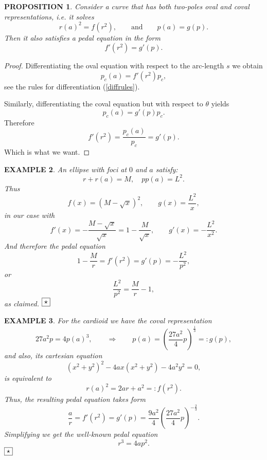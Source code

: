 \documentclass[10pt,a4paper,reqno]{amsart}
\newtheorem{defi}{\bf D\scriptsize EFINITION \normalsize}
\newtheorem{exa}[defi]{\bf E\scriptsize XAMPLE \normalsize}
\newtheorem{prop}[defi]{\bf P\scriptsize ROPOSITION \normalsize}
\def\kopr{\hfill\raisebox{3pt}{\framebox{$\star$}}}
\newenvironment{example}{\begin{exa}\rm}{$\kopr$\end{exa}}
\newenvironment{definition}{\begin{defi}\rm}{\end{defi}}
\newenvironment{proposition}{\begin{prop}\it}{\end{prop}}
\newcommand{\zav}[1]{\left( #1 \right)}
\begin{document}
\begin{proposition}
Consider a curve that has both two-poles oval and coval representations, i.e. it solves
$$
r(a)^2=f(r^2),\qquad \text{and} \qquad p(a)=g(p).
$$ 
Then it also satisfies a pedal equation in the form
$$
f'(r^2)=g'(p).
$$
\end{proposition}
\begin{proof}
Differentiating the oval equation with respect to the arc-length $s$ we obtain
$$
p_c(a)=f'(r^2)p_c,
$$
see the rules for differentiation (\ref{diffrules}).

Similarly, differentiating the coval equation but with respect to $\theta$ yields
$$
p_c(a)=g'(p)p_c.
$$ 
Therefore
$$
f'(r^2)=\frac{p_c(a)}{p_c}=g'(p).
$$
Which is what we want.
\end{proof}
\begin{example}
An ellipse with foci at $0$ and $a$ satisfy:
$$
r+r(a)=M,\quad pp(a)=L^2. 
$$
Thus
$$
f(x)=(M-\sqrt{x})^2,\qquad g(x)=\frac{L^2}{x},
$$
in our case with
$$
f'(x)=-\frac{M-\sqrt{x}}{\sqrt{x}}=1-\frac{M}{\sqrt{x}},\qquad g'(x)=-\frac{L^2}{x^2}.
$$
And therefore the pedal equation
$$
1-\frac{M}{r}=f'(r^2)=g'(p)=-\frac{L^2}{p^2},
$$
or
$$
\frac{L^2}{p^2}=\frac{M}{r}-1,
$$
as claimed.
\end{example}
\begin{example}
For the cardioid we have the coval representation
$$
27a^2p=4p(a)^3,\qquad \Longrightarrow \qquad p(a)=\zav{\frac{27 a^2}{4}p}^{\frac13}=:g(p),
$$
and also, its cartesian equation
$$
(x^2+y^2)^2-4ax(x^2+y^2)-4a^2y^2=0,
$$
is equivalent to 
$$
r(a)^2=2a r+a^2=:f(r^2).
$$
Thus, the resulting pedal equation takes form
$$
\frac{a}{r}=f'(r^2)=g'(p)=\frac{9a^2}{4} \zav{\frac{27 a^2}{4}p}^{-\frac23}.
$$
Simplifying we get the well-known pedal equation
$$
r^3=4a p^2.
$$
\end{example}
\end{document}
